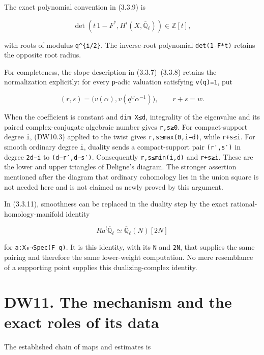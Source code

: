\documentclass[
]{report}
\begin{document}
The exact polynomial convention in (3.3.9) is

\[
\det(t\,1-F^*,H^i(X,\overline{\mathbb Q}_\ell))\in\mathbb Z[t],
\tag{DW10.7}
\]

with roots of modulus \texttt{q\^{}\{i/2\}}. The inverse-root polynomial
\texttt{det(1-F*t)} retains the opposite root radius.

For completeness, the slope description in (3.3.7)--(3.3.8) retains the
normalization explicitly: for every \texttt{p}-adic valuation satisfying
\texttt{v(q)=1}, put

\[
(r,s)=\bigl(v(\alpha),v(q^w\alpha^{-1})\bigr),
\qquad r+s=w.
\tag{DW10.8}
\]

When the coefficient is constant and \texttt{dim\ X≤d}, integrality of
the eigenvalue and its paired complex-conjugate algebraic number gives
\texttt{r,s≥0}. For compact-support degree \texttt{i}, (DW10.3) applied
to the twist gives \texttt{r,s≥max(0,i−d)}, while \texttt{r+s≤i}. For
smooth ordinary degree \texttt{i}, duality sends a compact-support pair
\texttt{(r′,s′)} in degree \texttt{2d−i} to \texttt{(d−r′,d−s′)}.
Consequently \texttt{r,s≤min(i,d)} and \texttt{r+s≥i}. These are the
lower and upper triangles of Deligne's diagram. The stronger assertion
mentioned after the diagram that ordinary cohomology lies in the union
square is not needed here and is not claimed as newly proved by this
argument.

In (3.3.11), smoothness can be replaced in the duality step by the exact
rational-homology-manifold identity

\[
Ra^!\overline{\mathbb Q}_\ell
\simeq\overline{\mathbb Q}_\ell(N)[2N]
\tag{DW10.9}
\]

for \texttt{a:X₀→Spec(F\_q)}. It is this identity, with its \texttt{N}
and \texttt{2N}, that supplies the same pairing and therefore the same
lower-weight computation. No mere resemblance of a supporting point
supplies this dualizing-complex identity.

\section{DW11. The mechanism and the exact roles of its
data}\label{dw11.-the-mechanism-and-the-exact-roles-of-its-data}

The established chain of maps and estimates is
\end{document}
